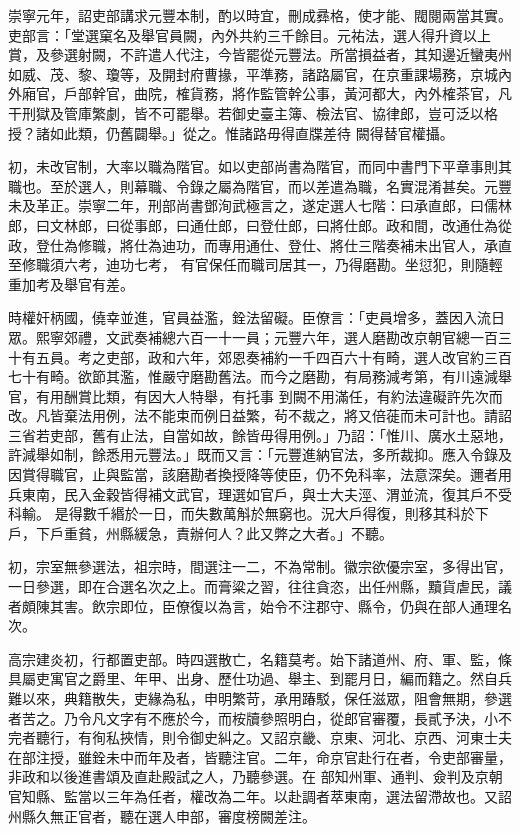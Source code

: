 \begin{pinyinscope}
 崇寧元年，詔吏部講求元豐本制，酌以時宜，刪成彞格，使才能、閥閱兩當其實。
 吏部言：「堂選窠名及舉官員闕，內外共約三千餘目。元祐法，選人得升資以上賞，及參選射闕，不許遣人代注，今皆罷從元豐法。所當損益者，其知邊近蠻夷州如威、茂、黎、瓊等，及開封府曹掾，平準務，諸路屬官，在京重課場務，京城內外廂官，戶部幹官，曲院，榷貨務，將作監管幹公事，黃河都大，內外榷茶官，凡干刑獄及管庫繁劇，皆不可罷舉。若御史臺主簿、檢法官、協律郎，豈可泛以格授？諸如此類，仍舊闢舉。」從之。惟諸路毋得直牒差待
 闕得替官權攝。



 初，未改官制，大率以職為階官。如以吏部尚書為階官，而同中書門下平章事則其職也。至於選人，則幕職、令錄之屬為階官，而以差遣為職，名實混淆甚矣。元豐未及革正。崇寧二年，刑部尚書鄧洵武極言之，遂定選人七階：曰承直郎，曰儒林郎，曰文林郎，曰從事郎，曰通仕郎，曰登仕郎，曰將仕郎。政和間，改通仕為從政，登仕為修職，將仕為迪功，而專用通仕、登仕、將仕三階奏補未出官人，承直至修職須六考，迪功七考，
 有官保任而職司居其一，乃得磨勘。坐愆犯，則隨輕重加考及舉官有差。



 時權奸柄國，僥幸並進，官員益濫，銓法留礙。臣僚言：「吏員增多，蓋因入流日眾。熙寧郊禮，文武奏補總六百一十一員；元豐六年，選人磨勘改京朝官總一百三十有五員。考之吏部，政和六年，郊恩奏補約一千四百六十有畸，選人改官約三百七十有畸。欲節其濫，惟嚴守磨勘舊法。而今之磨勘，有局務減考第，有川遠減舉官，有用酬賞比類，有因大人特舉，有托事
 到闕不用滿任，有約法違礙許先次而改。凡皆棄法用例，法不能束而例日益繁，茍不裁之，將又倍蓰而未可計也。請詔三省若吏部，舊有止法，自當如故，餘皆毋得用例。」乃詔：「惟川、廣水土惡地，許減舉如制，餘悉用元豐法。」既而又言：「元豐進納官法，多所裁抑。應入令錄及因賞得職官，止與監當，該磨勘者換授降等使臣，仍不免科率，法意深矣。邇者用兵東南，民入金穀皆得補文武官，理選如官戶，與士大夫涇、渭並流，復其戶不受科輸。
 是得數千緡於一日，而失數萬斛於無窮也。況大戶得復，則移其科於下戶，下戶重貧，州縣緩急，責辦何人？此又弊之大者。」不聽。



 初，宗室無參選法，祖宗時，間選注一二，不為常制。徽宗欲優宗室，多得出官，一日參選，即在合選名次之上。而膏粱之習，往往貪恣，出任州縣，黷貨虐民，議者頗陳其害。飲宗即位，臣僚復以為言，始令不注郡守、縣令，仍與在部人通理名次。



 高宗建炎初，行都置吏部。時四選散亡，名籍莫考。始下諸道州、府、軍、監，條
 具屬吏寓官之爵里、年甲、出身、歷仕功過、舉主、到罷月日，編而籍之。然自兵難以來，典籍散失，吏緣為私，申明繁苛，承用踳駁，保任滋眾，阻會無期，參選者苦之。乃令凡文字有不應於今，而桉牘參照明白，從郎官審覆，長貳予決，小不完者聽行，有徇私挾情，則令御史糾之。又詔京畿、京東、河北、京西、河東士夫在部注授，雖銓未中而年及者，皆聽注官。二年，命京官赴行在者，令吏部審量，非政和以後進書頌及直赴殿試之人，乃聽參選。在
 部知州軍、通判、僉判及京朝官知縣、監當以三年為任者，權改為二年。以赴調者萃東南，選法留滯故也。又詔州縣久無正官者，聽在選人申部，審度榜闕差注。




\end{pinyinscope}
